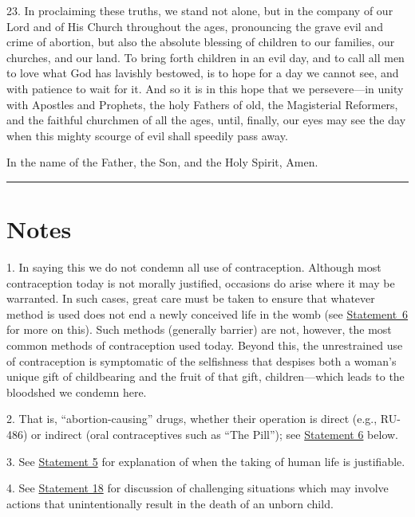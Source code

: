 \documentclass[
]{book}
\begin{document}
23. In proclaiming these truths, we stand not alone, but in the company of our Lord and of His Church throughout the ages, pronouncing the grave evil and crime of abortion, but also the absolute blessing of children to our families, our churches, and our land. To bring forth children in an evil day, and to call all men to love what God has lavishly bestowed, is to hope for a day we cannot see, and with patience to wait for it. And so it is in this hope that we persevere---in unity with Apostles and Prophets, the holy Fathers of old, the Magisterial Reformers, and the faithful churchmen of all the ages, until, finally, our eyes may see the day when this mighty scourge of evil shall speedily pass away.

In the name of the Father, the Son, and the Holy Spirit, Amen.

\begin{center}\rule{0.5\linewidth}{0.5pt}\end{center}

\hypertarget{notes-1}{%
\section*{Notes}\label{notes-1}}

1. In saying this we do not condemn all use of contraception. Although most contraception today is not morally justified, occasions do arise where it may be warranted. In such cases, great care must be taken to ensure that whatever method is used does not end a newly conceived life in the womb (see \protect\hyperlink{statement-06}{Statement~6} for more on this). Such methods (generally barrier) are not, however, the most common methods of contraception used today. Beyond this, the unrestrained use of contraception is symptomatic of the selfishness that despises both a woman's unique gift of childbearing and the fruit of that gift, children---which leads to the bloodshed we condemn here.

2. That is, ``abortion-causing'' drugs, whether their operation is direct (e.g., RU-486) or indirect (oral contraceptives such as ``The Pill''); see \protect\hyperlink{statement-06}{Statement 6} below.

3. See \protect\hyperlink{statement-05}{Statement 5} for explanation of when the taking of human life is justifiable.

4. See \protect\hyperlink{statement-18}{Statement 18} for discussion of challenging situations which may involve actions that unintentionally result in the death of an unborn child.
\end{document}
